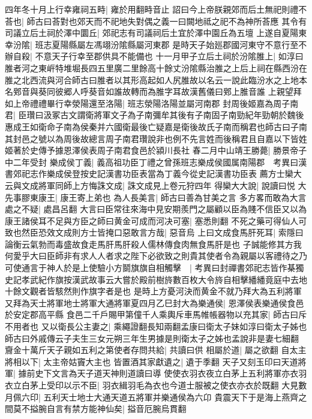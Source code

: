 四年冬十月上行幸雍祠五畤|{
	雍於用翻畤音止}
詔曰今上帝朕親郊而后土無祀則禮不荅也|{
	師古曰荅對也郊天而不祀地失對偶之義一曰闕地祗之祀不為神所荅應}
其令有司議立后土祠於澤中圜丘|{
	郊祀志有司議祠后土宜於澤中園丘為五壇}
上遂自夏陽東幸汾隂|{
	班志夏陽縣屬左馮翊汾隂縣屬河東郡}
是時天子始廵郡國河東守不意行至不辦自殺|{
	不意天子行幸至郡供具不能備也}
十一月甲子立后土祠於汾隂脽上|{
	如淳曰脽者河之東㟁特堆堀長四五里廣二里餘高十餘丈汾隂縣治脽之上后上祠在縣西汾在脽之北西流與河合師古曰脽者以其形高起如人尻脽故以名云一說此臨汾水之上地本名鄈音與葵同彼郷人呼葵音如誰故轉而為脽字耳故漢舊儀曰鄈上脽音誰}
上親望拜如上帝禮禮畢行幸滎陽還至洛陽|{
	班志滎陽洛陽並屬河南郡}
封周後姬嘉為周子南君|{
	臣瓚曰汲冢古文謂衛將軍文子為子南彌牟其後有子南固子南勁紀年勁朝於魏後惠成王如衛命子南為侯秦并六國衛最後亡疑嘉是衛後故氏子南而稱君也師古曰子南其封邑之號以為周後故總言周子南君瓚說非也例不先言姓而後稱君且自嘉以下皆姓姬著於史傳予據恩澤侯表周子南君食邑於潁川長社}
春二月中山靖王勝薨|{
	勝景帝子中二年受封}
樂成侯丁義|{
	義高祖功臣丁禮之曾孫班志樂成侯國属南陽郡　考異曰漢書郊祀志作樂成侯登按史記漢書功臣表當為丁義今從史記漢書功臣表}
薦方士欒大云與文成將軍同師上方悔誅文成|{
	誅文成見上卷元狩四年}
得欒大大說|{
	說讀曰悦}
大先事膠東康王|{
	康王寄上弟也}
為人長美言|{
	師古曰善為甘美之言}
多方畧而敢為大言處之不疑|{
	處昌呂翻}
大言曰臣常往來海中見安期羨門之屬顧以臣為賤不信臣又以為康王諸侯耳不足與方臣之師曰黄金可成而河决可塞|{
	塞悉則翻}
不死之藥可得仙人可致也然臣恐效文成則方士皆掩口惡敢言方哉|{
	惡音烏}
上曰文成食馬肝死耳|{
	索隱曰論衡云氣勃而毒盛故食走馬肝馬肝殺人儒林傳食肉無食馬肝是也}
子誠能修其方我何愛乎大曰臣師非有求人人者求之陛下必欲致之則貴其使者令為親屬以客禮待之乃可使通言于神人於是上使驗小方鬬旗旗自相觸擊　|{
	考異曰封禪書郊祀志皆作棊獨史記孝武紀作旗按漢武故事云大嘗於殿前樹旍數百枚大令旍自相擊繙繙竟庭中去地十餘文觀者皆駭然則作旗字者是也}
是時上方憂河決而黄金不就乃拜大為五利將軍又拜為天士將軍地士將軍大通將軍夏四月乙巳封大為樂通侯|{
	恩澤侯表樂通侯食邑於安定郡高平縣}
食邑二千戶賜甲第僮千人乘輿斥車馬帷帳器物以充其家|{
	師古曰斥不用者也}
又以衛長公主妻之|{
	乘繩證翻長知兩翻孟康曰衛太子妹如淳曰衛太子姊也師古曰外戚傳云子夫生三女元朔三年生男據是則衛太子之姊也孟說非是妻七細翻}
齎金十萬斤天子親如五利之第使者存問共給|{
	共讀曰供}
相屬於道|{
	屬之欲翻}
自太主將相以下|{
	太主帝姑竇大主也}
皆置酒其家獻遺之|{
	遺于季翻}
天子又刻玉印曰天道將軍|{
	據前史下文言為天子道天神則道讀曰導}
使使衣羽衣夜立白茅上五利將軍亦衣羽衣立白茅上受印以示不臣|{
	羽衣緝羽毛為衣也今道士服被之使衣亦衣於既翻}
大見數月佩六印|{
	五利天士地士大通天道五將軍并樂通侯為六卬}
貴震天下于是海上燕齊之間莫不搤腕自言有禁方能神仙矣|{
	搤音厄腕烏貫翻}
